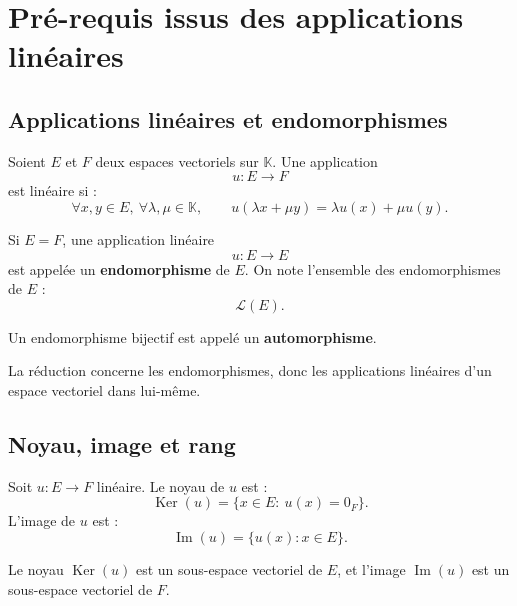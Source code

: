 \documentclass[11pt,a4paper]{article}
\newcommand{\K}{\mathbb K}
\newcommand{\Lcal}{\mathcal L}
\newcommand{\Ker}{\operatorname{Ker}}
\newcommand{\Imf}{\operatorname{Im}}
\begin{document}
\section{Pré-requis issus des applications linéaires}

\subsection{Applications linéaires et endomorphismes}

\begin{definitionbox}
Soient \(E\) et \(F\) deux espaces vectoriels sur \(\K\).  
Une application
\[
u:E\to F
\]
est linéaire si :
\[
\forall x,y\in E,\ \forall \lambda,\mu\in\K,
\qquad
u(\lambda x+\mu y)=\lambda u(x)+\mu u(y).
\]
\end{definitionbox}

\begin{definitionbox}[Endomorphisme]
Si \(E=F\), une application linéaire
\[
u:E\to E
\]
est appelée un \textbf{endomorphisme} de \(E\).  
On note l'ensemble des endomorphismes de \(E\) :
\[
\Lcal(E).
\]
\end{definitionbox}

\begin{definitionbox}[Automorphisme]
Un endomorphisme bijectif est appelé un \textbf{automorphisme}.
\end{definitionbox}

\begin{retenirbox}
La réduction concerne les endomorphismes, donc les applications linéaires d'un espace vectoriel dans lui-même.
\end{retenirbox}

\subsection{Noyau, image et rang}

\begin{definitionbox}
Soit \(u:E\to F\) linéaire.  
Le noyau de \(u\) est :
\[
\Ker(u)=\{x\in E:\ u(x)=0_F\}.
\]
L'image de \(u\) est :
\[
\Imf(u)=\{u(x):x\in E\}.
\]
\end{definitionbox}

\begin{theorembox}
Le noyau \(\Ker(u)\) est un sous-espace vectoriel de \(E\), et l'image \(\Imf(u)\) est un sous-espace vectoriel de \(F\).
\end{theorembox}
\end{document}
